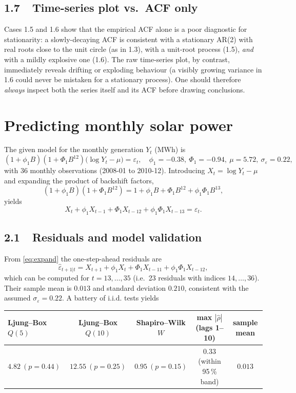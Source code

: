 \documentclass[11pt,a4paper]{article}
\begin{document}
\subsection*{1.7~~Time-series plot vs.\ ACF only}
Cases 1.5 and 1.6 show that the empirical ACF alone is a poor diagnostic for
stationarity: a slowly-decaying ACF is consistent with a stationary AR(2)
with real roots close to the unit circle (as in 1.3), with a unit-root
process (1.5), \emph{and} with a mildly explosive one (1.6). The raw
time-series plot, by contrast, immediately reveals drifting or exploding
behaviour (a visibly growing variance in 1.6 could never be mistaken for a
stationary process). One should therefore \emph{always} inspect both the
series itself and its ACF before drawing conclusions.

\section{Predicting monthly solar power}
The given model for the monthly generation $Y_t$ (MWh) is
\[
  (1+\phi_1 B)(1+\Phi_1 B^{12})\bigl(\log Y_t-\mu\bigr)=\varepsilon_t,
  \quad\phi_1=-0.38,\ \Phi_1=-0.94,\ \mu=5.72,\ \sigma_\varepsilon=0.22,
\]
with 36 monthly observations (2008-01 to 2010-12).
Introducing $X_t=\log Y_t-\mu$ and expanding the product of backshift factors,
\[
  (1+\phi_1 B)(1+\Phi_1 B^{12}) = 1+\phi_1 B+\Phi_1 B^{12}+\phi_1\Phi_1 B^{13},
\]
yields
\begin{equation}\label{eq:expand}
  X_t+\phi_1 X_{t-1}+\Phi_1 X_{t-12}+\phi_1\Phi_1 X_{t-13}=\varepsilon_t.
\end{equation}

\subsection*{2.1~~Residuals and model validation}
From \eqref{eq:expand} the one-step-ahead residuals are
\[
  \hat\varepsilon_{t+1|t}=X_{t+1}+\phi_1 X_{t}+\Phi_1 X_{t-11}+\phi_1\Phi_1 X_{t-12},
\]
which can be computed for $t=13,\dots,35$ (i.e.\ 23 residuals with indices
$14,\dots,36$). Their sample mean is $0.013$ and standard deviation $0.210$,
consistent with the assumed $\sigma_\varepsilon=0.22$. A battery of i.i.d.
tests yields

\begin{center}\small
\begin{tabular}{@{}lcccc@{}}\toprule
Ljung--Box $Q(5)$ & Ljung--Box $Q(10)$ & Shapiro--Wilk $W$ & max $|\hat\rho|$ (lags 1--10) & sample mean\\\midrule
$4.82\ (p=0.44)$ & $12.55\ (p=0.25)$ & $0.95\ (p=0.15)$ & $0.33$ (within 95\,\% band) & $0.013$ \\\bottomrule
\end{tabular}
\end{center}
\end{document}
